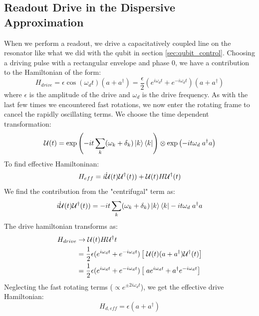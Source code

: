 \subsection{Readout Drive in the Dispersive Approximation}
When we perform a readout, we drive a capacitatively coupled line on the resonator like what we did with the qubit in section \ref{sec:qubit_control}. Choosing a driving pulse with a rectangular envelope and phase 0, we have a contribution to the Hamiltonian of the form:
\begin{equation}
    H_{drive} = \epsilon\cos(\omega_d t)(a + a^\dagger) = \frac{\epsilon}{2} \left(e^{i\omega_d t} + e^{-i\omega_d t}\right)(a + a^\dagger)    
\end{equation}
where $\epsilon$ is the amplitude of the drive and $\omega_d$ is the drive frequency. As with the last few times we encountered fast rotations, we now enter the rotating frame to cancel the rapidly oscillating terms. We choose the time dependent transformation:
\begin{equation}
    \mathcal{U}(t) = \exp\left(- i t \sum_k (\omega_k + \delta_k) \ket{k}\bra{k}\right) \otimes \exp \left(- i t \omega_d \;  a^\dagger a \right)
\end{equation}
To find effective Hamiltoninan:
\begin{equation}
    H_{eff} = \dot{i \mathcal{U}}{(t)}\mathcal{U}^\dagger(t)) + \mathcal{U}(t) H \mathcal{U}^\dagger(t)
\end{equation}
We find the contribution from the "centrifugal" term as:
\begin{equation}
    \dot{i \mathcal{U}}{(t)}\mathcal{U}^\dagger(t)) = - i t \sum_k (\omega_k + \delta_k) \ket{k}\bra{k} - it \omega_d \;  a^\dagger a
\end{equation}
The drive hamiltonian transforms as:
\begin{align*}
    H_{drive} &\to \mathcal{U}(t) H_{} \mathcal{U}^\dagger{t} \\
    &= \frac12 \epsilon (e^{i\omega_d t} + e^{-i\omega_d t}) \left[ \; \mathcal{U}(t)  (a + a^\dagger) \mathcal{U}^\dagger(t)\right] \\
    &= \frac12 \epsilon (e^{i\omega_d t} + e^{-i\omega_d t}) \left[ \;a e^{i \omega_d t} + a^\dagger e^{-i \omega_d t} \right]
\end{align*}
Neglecting the fast rotating terms ($\propto e^{\pm 2i\omega_dt}$), we get the effective drive Hamiltonian:
\begin{equation}
    H_{d, eff} = \epsilon(a + a^\dagger)
\end{equation}
